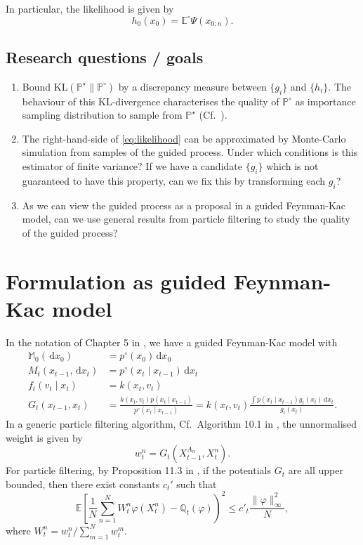\documentclass[11pt,reqno]{amsart}
\newcommand{\dd}{{\,\mathrm d}}
\renewcommand{\phi}{\varphi}
\newcommand{\EE}{\mathbb{E}}
\newcommand{\PP}{\mathbb{P}}
\theoremstyle{definition}
\newcommand{\KL}[2]{\mathrm{KL}\left(#1 \| #2\right)}
\begin{document}
In particular, the likelihood is given by 
\begin{equation}\label{eq:likelihood}
	h_0(x_0) = \EE^\circ  \Psi(x_{0:n}). 
\end{equation} 



\subsection{Research questions / goals}
\begin{enumerate}
	\item Bound $\KL{\PP^\star}{\PP^\circ}$ by a discrepancy measure between $\{g_i\}$ and $\{h_i\}$. The behaviour of this KL-divergence characterises the quality of $\PP^\circ$ as importance sampling distribution to sample from $\PP^\star$ (Cf.\ \cite{chatterjee2018sample}).  
	\item The right-hand-side of \eqref{eq:likelihood} can be approximated by Monte-Carlo simulation from samples of the guided process.  Under which conditions is this estimator of finite variance? If we have a candidate $\{g_i\}$  which is not guaranteed to have this property, can we fix this by transforming each $g_i$?
	\item As we can view the guided process as a proposal in a guided Feynman-Kac model, can we use general results from particle filtering to study the quality of the guided process?
\end{enumerate}


\section{Formulation as guided Feynman-Kac model} 
In the notation of Chapter 5 in \cite{smcbook}, we have a guided Feynman-Kac model with 
\begin{align*}
\mathbb{M}_0(\dd x_0)&= p^\circ(x_0) \dd x_0 \\
 M_t(x_{t-1}, \dd x_t) &= p^\circ(x_t \mid x_{t-1}) \dd x_t \\
 f_t(v_t \mid x_t) &= k(x_t, v_t) \\
 G_t(x_{t-1}, x_t) &= \frac{k(x_t, v_t) p(x_t \mid x_{t-1})}{p^\circ(x_t\mid x_{t-1})}=k(x_t, v_t) \frac{\int p(x_t\mid x_{t-1}) g_t(x_t) \dd x_t}{g_t(x_t)}. 
\end{align*}
In a generic particle filtering algorithm, Cf.\ Algorithm 10.1 in \cite{smcbook}, the unnormalised weight is given by 
\[ w_t^n = G_t(X_{t-1}^{A_n}, X_t^n). \]
For particle filtering, by Proposition 11.3 in \cite{smcbook}, if the potentials $G_t$ are all upper bounded, then there exist constants $c_t'$ such that 
\[ \EE \left[ \frac1{N} \sum_{n=1}^N W_t^n \phi(X_t^n) - \mathbb{Q}_t(\phi)\right)^2 \le c'_t \frac{\|\phi\|^2_\infty}{N}, \]
where $W_t^n = w_t^n/\sum_{m=1}^N w_t^m$. 
\end{document}
